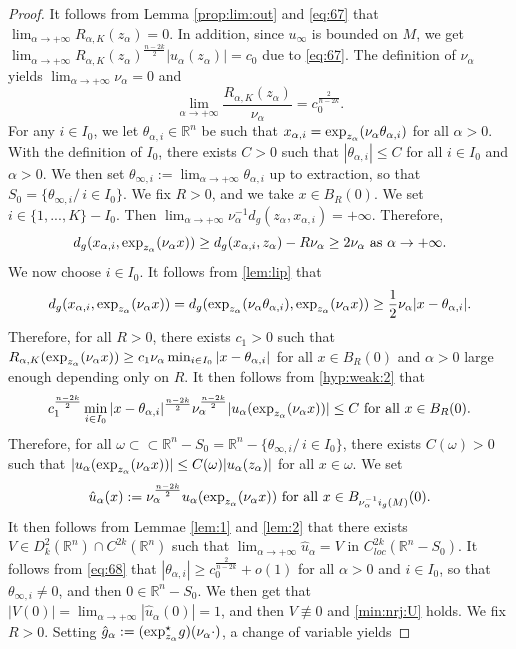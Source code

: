 \documentclass[reqno]{amsart}
\def \rn {\mathbb{R}^n}
\def \ua {u_\alpha}
\def \na {\nu_\alpha}
\def \za {z_\alpha}
\def \xai {x_{\alpha,i}}
\begin{document}
\begin{proof} It follows from Lemma \ref{prop:lim:out} and \eqref{eq:67} that  $\lim_{\alpha\to +\infty}R_{\alpha, K}(\za)=0$. In addition, since $u_\infty$ is bounded on $M$, we get  $\lim_{\alpha\to +\infty}R_{\alpha, K}(\za)^{\frac{n-2k}{2}}|\ua(\za)|=c_0$ due to  \eqref{eq:67}. The definition of $\na$ yields $\lim_{\alpha\to +\infty}\na=0$ and 
\begin{equation}\label{eq:68}
\lim_{\alpha\to +\infty}\frac{R_{\alpha, K}(\za)}{\na}=c_0^{\frac{2}{n-2k}}.
\end{equation}
For any $i\in I_0$, we let $\theta_{\alpha, i}\in \rn$ be such that $\xai=\hbox{exp}_{\za}(\na \theta_{\alpha, i})$ for all $\alpha>0$. With the definition of $I_0$, there exists $C>0$ such that $|\theta_{\alpha,i}|\leq C$ for all $i\in I_0$ and $\alpha>0$. We then set $\theta_{\infty,i}:=\lim_{\alpha\to +\infty}\theta_{\alpha,i}$ up to extraction, so that $S_0=\{\theta_{\infty,i}/\, i\in I_0\}$. We fix $R>0$, and we take $x\in B_R(0)$. We set $i\in\{1,...,K\} -  I_0$. Then $\lim_{\alpha\to +\infty}\na^{-1}d_g(\za,\xai)=+\infty$. Therefore,
$$d_g(\xai, \hbox{exp}_{\za}(\na x))\geq d_g(\xai,\za)-R\na\geq 2\na\hbox{ as }\alpha\to +\infty.$$
We now choose $i\in I_0$. It follows from \eqref{lem:lip} that
$$d_g(\xai, \hbox{exp}_{\za}(\na x))= d_g(\hbox{exp}_{\za}(\na \theta_{\alpha, i}), \hbox{exp}_{\za}(\na x))\geq \frac{1}{2}\na |x-\theta_{\alpha,i}|.$$
Therefore, for all $R>0$, there exists $c_1>0$ such that $R_{\alpha, K}(\hbox{exp}_{\za}(\na x))\geq c_1\na\min_{i\in I_0}|x-\theta_{\alpha,i}|$ for all $x\in B_R(0)$ and $\alpha>0$ large enough depending only on $R$. It then follows from \eqref{hyp:weak:2} that
$$c_1^{\frac{n-2k}{2}}\min_{i\in I_0}|x-\theta_{\alpha,i}|^{\frac{n-2k}{2}}\na^{\frac{n-2k}{2}}|\ua(\hbox{exp}_{\za}(\na x))|\leq C\hbox{ for all }x\in B_R(0).$$
Therefore, for all $\omega\subset\subset \rn-S_0=\rn-\{\theta_{\infty,i}/\, i\in I_0\}$, there exists $C(\omega)>0$ such that $|\ua(\hbox{exp}_{\za}(\na x))|\leq C(\omega)|\ua(\za)|$ for all $x\in\omega$. We set 
$$\hat{u}_\alpha(x):=\na^{\frac{n-2k}{2}}\ua(\hbox{exp}_{z_\alpha}(\na x))\hbox{ for all }x\in B_{\na^{-1}i_g(M)}(0).$$
It then follows from Lemmae \ref{lem:1} and \ref{lem:2} that there exists $V\in D_k^2(\rn)\cap C^{2k}(\rn)$ such that $\lim_{\alpha\to +\infty}\hat{u}_\alpha=V$ in $C^{2k}_{loc}(\rn-S_0)$. It follows from \eqref{eq:68} that $|\theta_{\alpha,i}|\geq c_0^{\frac{2}{n-2k}}+o(1)$ for all $\alpha>0$ and $i\in I_0$, so that $\theta_{\infty,i}\neq 0$, and then $0\in\rn-S_0$. We then get that $|V(0)|=\lim_{\alpha\to +\infty}|\hat{u}_\alpha(0)|=1$, and then $V\not\equiv 0$ and \eqref{min:nrj:U} holds. We fix $R>0$. Setting $\hat{g}_\alpha:=(\hbox{exp}_{\za}^\star g)(\na\cdot)$, a change of variable yields

\end{proof}
\end{document}
